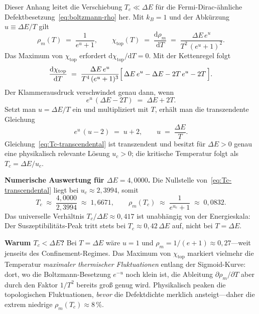 \documentclass[11pt,a4paper]{article}
\newcommand{\dd}{\mathrm{d}}
\begin{document}
Dieser Anhang leitet die Verschiebung $T_c \ll \Delta E$ f\"ur die Fermi-Dirac-\"ahnliche Defektbesetzung~\eqref{eq:boltzmann-rho} her. Mit $k_B=1$ und der Abk\"urzung $u \equiv \Delta E/T$ gilt
\begin{equation}
  \rho_m(T) \;=\; \frac{1}{e^u + 1},
  \qquad
  \chi_{\text{top}}(T) \;=\; \frac{\dd \rho_m}{\dd T}
  \;=\; \frac{\Delta E\, e^u}{T^2\,(e^u + 1)^2}.
  \label{eq:chi-analytic}
\end{equation}
Das Maximum von $\chi_{\text{top}}$ erfordert $\dd\chi_{\text{top}}/\dd T = 0$. Mit der Kettenregel folgt
\begin{equation}
  \frac{\dd \chi_{\text{top}}}{\dd T}
  \;=\; \frac{\Delta E\, e^u}{T^4\,(e^u + 1)^3}
  \Bigl[\,\Delta E\, e^u - \Delta E - 2T\, e^u - 2T\,\Bigr].
  \label{eq:dchi-dT}
\end{equation}
Der Klammerausdruck verschwindet genau dann, wenn
\begin{equation}
  e^u\,(\Delta E - 2T) \;=\; \Delta E + 2T.
  \label{eq:Tc-intermediate}
\end{equation}
Setzt man $u = \Delta E/T$ ein und multipliziert mit $T$, erh\"alt man die transzendente Gleichung
\begin{equation}
  e^u\,(u - 2) \;=\; u + 2,
  \qquad u \;=\; \frac{\Delta E}{T}.
  \label{eq:Tc-transcendental}
\end{equation}
Gleichung~\eqref{eq:Tc-transcendental} ist transzendent und besitzt f\"ur $\Delta E > 0$ genau eine physikalisch relevante L\"osung $u_c > 0$; die kritische Temperatur folgt als $T_c = \Delta E / u_c$.

\medskip
\noindent\textbf{Numerische Auswertung f\"ur $\Delta E = 4{,}0000$.} Die Nullstelle von~\eqref{eq:Tc-transcendental} liegt bei $u_c \approx 2{,}3994$, somit
\begin{equation}
  T_c \;\approx\; \frac{4{,}0000}{2{,}3994} \;\approx\; 1{,}6671,
  \qquad
  \rho_m(T_c) \;\approx\; \frac{1}{e^{u_c}+1} \;\approx\; 0{,}0832.
  \label{eq:Tc-exact-values}
\end{equation}
Das universelle Verh\"altnis $T_c / \Delta E \approx 0{,}417$ ist unabh\"angig von der Energieskala: Der Suszeptibilit\"ats-Peak tritt stets bei $T_c \approx 0{,}42\,\Delta E$ auf, nicht bei $T = \Delta E$.

\medskip
\noindent\textbf{Warum $T_c < \Delta E$?} Bei $T = \Delta E$ w\"are $u = 1$ und $\rho_m = 1/(e+1) \approx 0{,}27$---weit jenseits des Confinement-Regimes. Das Maximum von $\chi_{\text{top}}$ markiert vielmehr die Temperatur \emph{maximaler thermischer Fluktuationen} entlang der Sigmoid-Kurve: dort, wo die Boltzmann-Besetzung $e^{-u}$ noch klein ist, die Ableitung $\partial\rho_m/\partial T$ aber durch den Faktor $1/T^2$ bereits gro\ss{} genug wird. Physikalisch peaken die topologischen Fluktuationen, \emph{bevor} die Defektdichte merklich ansteigt---daher die extrem niedrige $\rho_m(T_c) \approx 8\,\%$.
\end{document}

